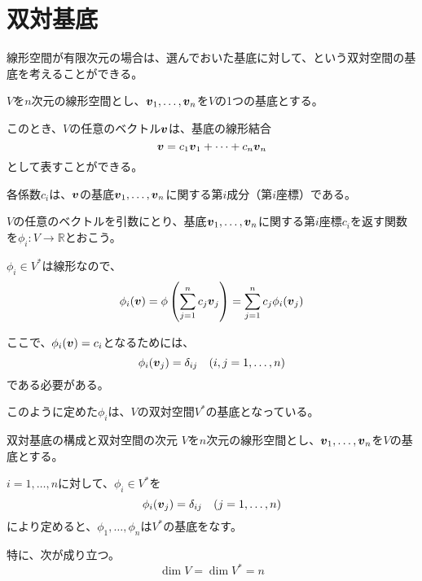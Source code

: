 \documentclass[../../../topic_linear-algebra]{subfiles}
\begin{document}
\sectionline
\section{双対基底}

線形空間が有限次元の場合は、選んでおいた基底に対して、という双対空間の基底を考えることができる。

\br

$V$を$n$次元の線形空間とし、$\vb*{v}_1,\ldots,\vb*{v}_n$を$V$の1つの基底とする。

このとき、$V$の任意のベクトル$\vb*{v}$は、基底の線形結合
\begin{equation*}
  \vb*{v} = c_1 \vb*{v}_1 + \cdots + c_n \vb*{v}_n
\end{equation*}
として表すことができる。

各係数$c_i$は、$\vb*{v}$の基底$\vb*{v}_1,\ldots,\vb*{v}_n$に関する第$i$成分（第$i$座標）である。

\br

$V$の任意のベクトルを引数にとり、基底$\vb*{v}_1,\ldots,\vb*{v}_n$に関する第$i$座標$c_i$を返す関数を$\phi_i \colon V \to \mathbb{R}$とおこう。

$\phi_i \in V^*$は線形なので、
\begin{equation*}
  \phi_i(\vb*{v}) = \phi\left(\sum_{j=1}^{n} c_j \vb*{v}_j\right) = \sum_{j=1}^{n} c_j \phi_i(\vb*{v}_j)
\end{equation*}

ここで、$\phi_i(\vb*{v})= c_i$となるためには、
\begin{equation*}
  \phi_i(\vb*{v}_j) = \delta_{ij} \quad (i,j=1,\ldots,n)
\end{equation*}
である必要がある。

\br

このように定めた$\phi_i$は、$V$の双対空間$V^*$の基底となっている。

\begin{theorem}{双対基底の構成と双対空間の次元}
  $V$を$n$次元の線形空間とし、$\vb*{v}_1,\ldots,\vb*{v}_n$を$V$の基底とする。
  
  $i = 1,\dots, n$に対して、$\phi_i \in V^*$を
  \begin{equation*}
    \phi_i(\vb*{v}_j) = \delta_{ij} \quad (j=1,\ldots,n)
  \end{equation*}
  により定めると、$\phi_1,\ldots,\phi_n$は$V^*$の基底をなす。
  
  特に、次が成り立つ。
  \begin{equation*}
    \dim V = \dim V^* = n
  \end{equation*}
\end{theorem}
\end{document}
